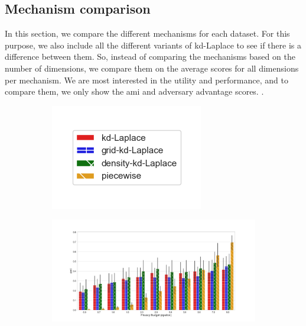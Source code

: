 \subsection{Mechanism comparison}
In this section, we compare the different mechanisms for each dataset.
For this purpose, we also include all the different variants of kd-Laplace to see if there is a difference between them.
So, instead of comparing the mechanisms based on the number of dimensions, we compare them on the average scores for all dimensions per mechanism.
We are most interested in the utility and performance, and to compare them, we only show the \gls{ami} and adversary advantage scores.
.
\begin{figure}[H]
      \centering
      \begin{subfigure}{0.30\textwidth}
            \includegraphics[width=\textwidth]{Results/kd-laplace/ami_bar_comparison_legend.png}
      \end{subfigure}
      \begin{subfigure}{1\textwidth}
            \includegraphics[width=1\textwidth]{Results/kd-laplace/ami_seeds-dataset_comparison.png}

\end{subfigure}
\end{figure}
